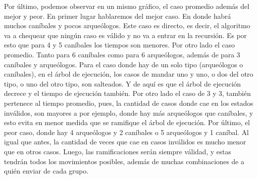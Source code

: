   Por último, podemos observar en un mismo gráfico, el caso promedio además del mejor y peor. En primer lugar hablaremos del mejor caso. En donde habrá muchos caníbales y pocos arqueólogos. Este caso es directo, es decir, el algoritmo va a chequear que ningún caso es válido y no va a entrar en la recursión. Es por esto que para 4 y 5 caníbales los tiempos son menores. Por otro lado el caso promedio. Tanto para 6 caníbales como para 6 arqueólogos, además de para 3 caníbales y arqueólogos. Para el caso donde hay de un solo tipo (arqueólogos o caníbales), en el árbol de ejecución, los casos de mandar uno y uno, o dos del otro tipo, o uno del otro tipo, son salteados. Y de aquí es que el árbol de ejecución decrece y el tiempo de ejecución también. Por otro lado el caso de 3 y 3,  también pertenece al tiempo promedio, pues, la cantidad de casos donde cae en los estados inválidos, son mayores a por ejemplo, donde hay más arqueólogos que caníbales, y esto evita en menor medida que se ramifique el árbol de ejecución. Por último, el peor caso, donde hay 4 arqueólogos y 2 caníbales o 5 arqueólogos y 1 caníbal. Al igual que antes, la cantidad de veces que cae en casos inválidos es mucho menor que en otros casos. Luego, las ramificaciones serán siempre válidad, y estas tendrán todos los movimientos posibles, además de muchas combinaciones de a quién enviar de cada grupo.